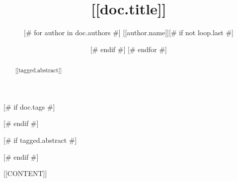 \documentclass{article}
\title{[[doc.title]]}
\author{[# for author in doc.authors #]
[[author.name]][# if not loop.last #] \and [# endif #]
[# endfor #]
}
\date{\displaydate{articleDate}}
\begin{document}
\maketitle

[# if doc.tags #]

[# endif #]

[# if tagged.abstract #]
\begin{abstract}
  [[tagged.abstract]]
\end{abstract}

[# endif #]


[[CONTENT]]



\end{document}
